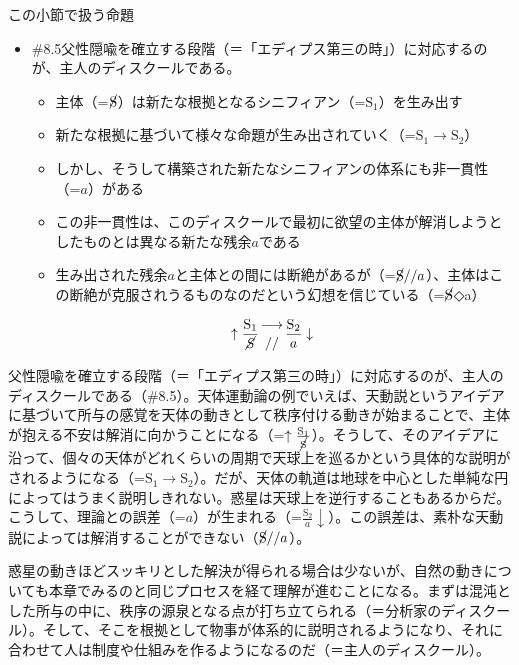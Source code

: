 \begin{note}{この小節で扱う命題}
  \begin{itemize}
    \tightlist
    \item{\#8.5}父性隠喩を確立する段階（＝「エディプス第三の時」）に対応するのが、主人のディスクールである。
      \begin{itemize}
        \tightlist
        \item 主体（=$\cancel{\textrm{S}}$）は新たな根拠となるシニフィアン（=$\textrm{S}_1$）を生み出す
        \item 新たな根拠に基づいて様々な命題が生み出されていく（=$\textrm{S}_1\rightarrow\textrm{S}_2$）
        \item しかし、そうして構築された新たなシニフィアンの体系にも非一貫性（=$a$）がある
        \item この非一貫性は、このディスクールで最初に欲望の主体が解消しようとしたものとは異なる新たな残余$a$である
        \item 生み出された残余$a$と主体との間には断絶があるが（=$\cancel{\textrm{S}}//a$）、主体はこの断絶が克服されうるものなのだという幻想を信じている（=$\cancel{\textrm{S}}$◇a）
      \end{itemize}

$$
\uparrow\frac{\mathrm{S_1}}{\mathrm{\cancel{S}}}\genfrac{}{}{0pt}{}{\longrightarrow}{//}\frac{\mathrm{S_2}}{a}\downarrow
$$
  \end{itemize}
\end{note}

父性隠喩を確立する段階（＝「エディプス第三の時」）に対応するのが、主人のディスクールである（\#8.5）。天体運動論の例でいえば、天動説というアイデアに基づいて所与の感覚を天体の動きとして秩序付ける動きが始まることで、主体が抱える不安は解消に向かうことになる（=\(\uparrow\frac{\textrm{S}_1}{\cancel{\textrm{S}}}\)）。そうして、そのアイデアに沿って、個々の天体がどれくらいの周期で天球上を巡るかという具体的な説明がされるようになる（=\(\textrm{S}_1\rightarrow\textrm{S}_2\)）。だが、天体の軌道は地球を中心とした単純な円によってはうまく説明しきれない。惑星は天球上を逆行することもあるからだ。こうして、理論との誤差（=\(a\)）が生まれる（=\(\frac{\textrm{S}_2}{a}\downarrow\)）。この誤差は、素朴な天動説によっては解消することができない（\(\cancel{\textrm{S}}//a\)）。

惑星の動きほどスッキリとした解決が得られる場合は少ないが、自然の動きについても本章でみるのと同じプロセスを経て理解が進むことになる。まずは混沌とした所与の中に、秩序の源泉となる点が打ち立てられる（＝分析家のディスクール）。そして、そこを根拠として物事が体系的に説明されるようになり、それに合わせて人は制度や仕組みを作るようになるのだ（＝主人のディスクール）。

